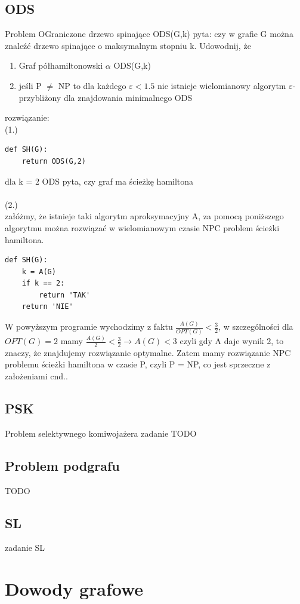 \documentclass{article}
\begin{document}
\subsection*{ODS}
Problem OGraniczone drzewo spinające ODS(G,k) pyta: czy w grafie G można znaleźć drzewo spinające o maksymalnym stopniu k. Udowodnij, że 
\begin{enumerate}
	\item Graf półhamiltonowski $\alpha$ ODS(G,k)
	\item jeśli P $\ne$ NP to dla każdego $\varepsilon < 1.5$ nie istnieje wielomianowy algorytm $\varepsilon$-przybliżony dla znajdowania minimalnego ODS
\end{enumerate}
rozwiązanie:\\
(1.) 
\begin{lstlisting}
def SH(G):
	return ODS(G,2)
\end{lstlisting}
dla k = 2 ODS pyta, czy graf ma ścieżkę hamiltona \\\\
(2.) \\
załóżmy, że istnieje taki algorytm aproksymacyjny A, za pomocą poniższego algorytmu można rozwiązać w wielomianowym czasie NPC problem ścieżki hamiltona.
\begin{lstlisting}
def SH(G):
	k = A(G)
	if k == 2:
		return 'TAK'
	return 'NIE'
\end{lstlisting}
W powyższym programie wychodzimy z faktu $\frac{A(G)}{OPT(G)} < \frac{3}{2}$, w szczególności dla $OPT(G) = 2$ mamy 
$\frac{A(G)}{2} < \frac{3}{2} \rightarrow A(G) < 3$ czyli gdy A daje wynik 2, to znaczy, że znajdujemy rozwiązanie optymalne.
Zatem mamy rozwiązanie NPC problemu ścieżki hamiltona w czasie P, czyli P = NP, co jest sprzeczne z założeniami cnd.. 


\subsection*{PSK}
Problem selektywnego komiwojażera zadanie TODO

\subsection*{Problem podgrafu}
TODO

\subsection*{SL}
zadanie SL

\section{Dowody grafowe}
\end{document}
